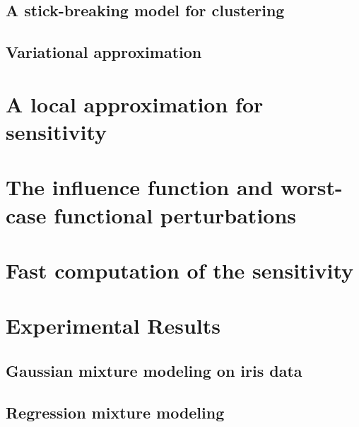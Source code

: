 \documentclass[ba]{imsart}
\begin{document}
    \subsection{A stick-breaking model for clustering}
    

    \subsection{Variational approximation}
    


\section{A local approximation for sensitivity}


\section{The influence function and worst-case functional perturbations}


\section{Fast computation of the sensitivity}


\section{Experimental Results}


    \subsection{Gaussian mixture modeling on iris data}
    

    \subsection{Regression mixture modeling}
    
\end{document}
